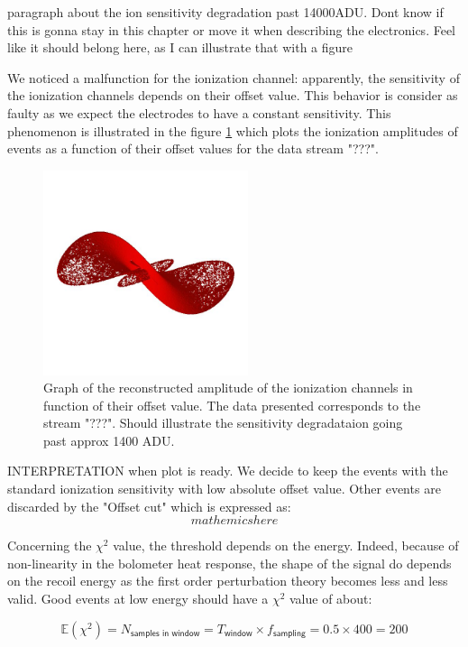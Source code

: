 {\color{red} paragraph about the ion sensitivity degradation past 14000ADU. Dont know if this is gonna stay in this chapter or move it when describing the electronics. Feel like it should belong here, as I can illustrate that with a figure}

We noticed a malfunction for the ionization channel: apparently, the sensitivity of the ionization channels depends on their offset value. This behavior is consider as faulty as we expect the electrodes to have a constant sensitivity. This phenomenon is illustrated in the figure \ref{fig:offset-problem} which plots the ionization amplitudes of events as a function of their offset values for the data stream "???".

\begin{figure}
\centering
\includegraphics[width=\linewidth, height=6cm]{Figures/placeholder.jpg}
\caption{Graph of the reconstructed amplitude of the ionization channels in function of their offset value. The data presented corresponds to the stream "???". Should illustrate the sensitivity degradataion going past approx 1400 ADU.}
\label{fig:offset-problem}
\end{figure}

INTERPRETATION when plot is ready.
We decide to keep the events with the standard ionization sensitivity with low absolute offset value. Other events are discarded by the "Offset cut" which is expressed as:
$$ mathemics here $$


Concerning the $\chi^2$ value, the threshold depends on the energy. Indeed, because of non-linearity in the bolometer heat response, the shape of the signal do depends on the recoil energy as the first order perturbation theory becomes less and less valid.
Good events at low energy should have a $\chi^2$ value of about:

\begin{equation}
\mathbb{E}\left( \chi^2 \right) 
= N_{\textsf{samples in window}}
 = T_{\textsf{window}} \times f_{\textsf{sampling}}
 = 0.5 \times 400 = 200
\end{equation}

